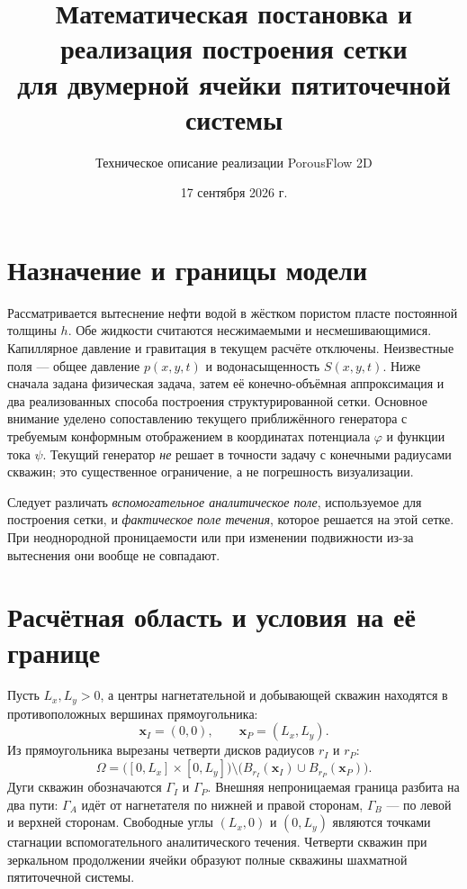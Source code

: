 \documentclass[12pt,a4paper]{article}
\title{Математическая постановка и реализация построения сетки\\
       для двумерной ячейки пятиточечной системы}
\author{Техническое описание реализации PorousFlow 2D}
\date{17 сентября 2026 г.}
\begin{document}
\maketitle
\tableofcontents
\newpage

\section{Назначение и границы модели}

Рассматривается вытеснение нефти водой в жёстком пористом пласте постоянной
толщины $h$. Обе жидкости считаются несжимаемыми и несмешивающимися.
Капиллярное давление и гравитация в текущем расчёте отключены. Неизвестные
поля --- общее давление $p(x,y,t)$ и водонасыщенность $S(x,y,t)$. Ниже сначала
задана физическая задача, затем её конечно-объёмная аппроксимация и два
реализованных способа построения структурированной сетки. Основное внимание
уделено сопоставлению текущего приближённого генератора с требуемым
конформным отображением в координатах потенциала $\varphi$ и функции тока
$\psi$. Текущий генератор \emph{не} решает в точности задачу с конечными
радиусами скважин; это существенное ограничение, а не погрешность
визуализации.

Следует различать \emph{вспомогательное аналитическое поле}, используемое
для построения сетки, и \emph{фактическое поле течения}, которое решается на
этой сетке. При неоднородной проницаемости или при изменении подвижности из-за
вытеснения они вообще не совпадают.

\section{Расчётная область и условия на её границе}

Пусть $L_x,L_y>0$, а центры нагнетательной и добывающей скважин находятся в
противоположных вершинах прямоугольника:
\begin{equation}
 \mathbf x_I=(0,0),\qquad \mathbf x_P=(L_x,L_y).
\end{equation}
Из прямоугольника вырезаны четверти дисков радиусов $r_I$ и $r_P$:
\begin{equation}
 \Omega=\bigl([0,L_x]\times[0,L_y]\bigr)
 \setminus\bigl(B_{r_I}(\mathbf x_I)\cup B_{r_P}(\mathbf x_P)\bigr).
 \label{eq:domain}
\end{equation}
Дуги скважин обозначаются $\Gamma_I$ и $\Gamma_P$. Внешняя непроницаемая
граница разбита на два пути: $\Gamma_A$ идёт от нагнетателя по нижней и правой
сторонам, $\Gamma_B$ --- по левой и верхней сторонам. Свободные углы
$(L_x,0)$ и $(0,L_y)$ являются точками стагнации вспомогательного
аналитического течения. Четверти скважин при зеркальном продолжении ячейки
образуют полные скважины шахматной пятиточечной системы.
\end{document}
